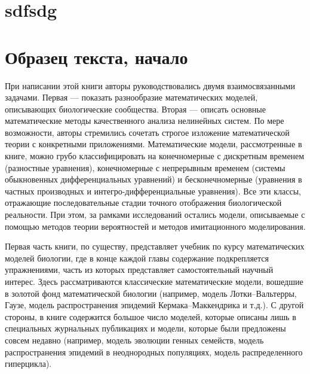 \documentclass[a4paper,12pt]{article}
\begin{document}
%
%
%

\tableofcontents

\section{sdfsdg}

\section{Образец текста, начало}
При  написании этой книги авторы руководствовались двумя взаимосвязанными
задачами. Первая --- показать разнообразие математических моделей, описывающих
биологические сообщества. Вторая --- описать основные математические методы качественного анализа нелинейных систем. По мере возможности, авторы стремились
сочетать строгое изложение математической теории с конкретными приложениями.
Математические модели, рассмотренные в книге, можно грубо классифицировать
на конечномерные с дискретным временем (разностные уравнения), конечномерные
с непрерывным временем (системы обыкновенных дифференциальных уравнений)
и бесконечномерные (уравнения в частных производных и интегро-дифференциальные уравнения). Все эти классы, отражающие последовательные стадии точного
отображения биологической реальности. При этом, за рамками исследований остались модели, описываемые с помощью методов теории вероятностей и методов имитационного моделирования.

Первая часть книги, по существу, представляет учебник по курсу математических
моделей биологии, где в конце каждой главы содержание подкрепляется упражнениями, часть из которых представляет самостоятельный научный интерес.
Здесь рассматриваются классические математические модели, вошедшие в золотой фонд математической биологии (например, модель Лотки--Вальтерры, Гаузе,
модель распространения эпидемий Кермака--Маккендрика и т.д.). С другой стороны, в книге содержится большое число моделей, которые описаны лишь в специальных журнальных публикациях и модели, которые были предложены совсем недавно
(например, модель эволюции генных семейств, модель распространения эпидемий в
неоднородных популяциях, модель распределенного гиперцикла).
\end{document}
